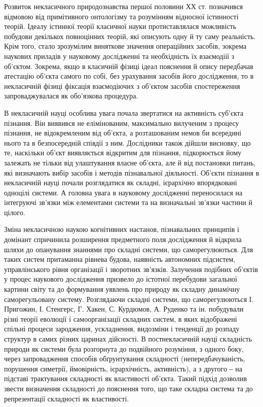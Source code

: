 Розвиток некласичного природознавства першої половини ХХ ст.
позначився відмовою від примітивного онтологізму та розумінням відносної
істинності теорій. Ідеалу істинної теорії класичної науки протиставлялася
можливість побудови декількох повноцінних теорій, які описують одну й ту
саму реальність. Крім того, стало зрозумілим виняткове значення операційних
засобів, зокрема наукових приладів у науковому дослідженні та необхідність їх
взаємодіії з об’єктом. Зокрема, якщо в класичній фізиці ідеал пояснення й
опису передбачав атестацію об’єкта самого по собі, без урахування засобів його
дослідження, то в некласичній фізиці фіксація взаємодіючих з об’єктом засобів
спостереження запроваджувалася як обо’язкова процедура.

В некласичній науці особлива увага почала звертатися на активність
суб’єкта пізнання. Він виявився не елімінованим, максимально вилученим з
процесу пізнання, не відокремленим від об’єкта, а розташованим немов би
всередині нього та в безпосередній співдії з ним. Дослідники також дійшли
висновку, що те, наскільки об’єкт виявляється відкритим для пізнання,
підкорюється йому залежать не тільки від улаштування власне об’єкта, але й
від постановки питань, які визначають вибір засобів і методів пізнавальної
діяльності. Об’єкти пізнання в некласичній науці почали розглядатися як
складні, ієрархічно впорядковані одноцілі системи. А головна увага в
науковому дослідженні переносилася на інтегруючі зв’язки між елементами
системи та на визначальні зв’язки частини й цілого.

Зміна некласичною наукою когнітивних настанов, пізнавальних принципів і
до\-мі\-нант сп\-ри\-чи\-ни\-ла розширення предметного поля дослідження й відкрила
шляхи до опанування знаннями про складні системи, що саморегулюються. Для
таких систем притаманна рівнева будова, наявність автономних підсистем,
управлінського рівня організації і зворотних зв’язків. Залучення подібних
об’єктів у процес наукового дослідження призвело до істотної перебудови
загальної картини світу та до формування уявлень про природу як складну
динамічну саморегульовану систему. Розглядаючи складні системи, що
саморегулюються І. Пригожин, І. Стенгерс, Г. Хакен, С. Курдюмов, А. Руденко
та ін. побудували різні теорії еволюції і самоорганізації складних систем, в яких
відображені спільні процеси зародження, ускладнення, видозміни і тенденції до
розпаду структур в самих різних царинах дійсності. В постнекласичній науці
складність природи як системи була розгорнута до подвійного розуміння, з
одного боку, через запровадження способів обґрунтування складності
(непередбачуваність, порушення симетрії, ймовірність, ієрархічність,
активність), а з другого ‒ на підставі трактування складності як властивості
об’єкта. Такий підхід дозволив звести визначення складності до пояснення
того, що таке складна система та до репрезентації складності як властивості.

